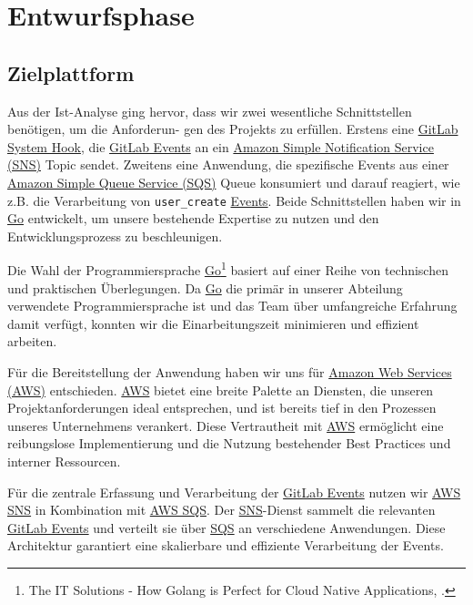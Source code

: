 \section{Entwurfsphase} 
\label{sec:Entwurfsphase}

\subsection{Zielplattform}
\label{sec:Zielplattform}

Aus der Ist-Analyse ging hervor, dass wir zwei wesentliche Schnittstellen benötigen, um die Anforderun-
gen des Projekts zu erfüllen. Erstens eine \hyperlink{GitLabSystemhooks}{\textcolor{AOBlau}{GitLab System Hook}}, die \hyperlink{GitLabEvent}{\textcolor{AOBlau}{GitLab Events}} an ein \hyperlink{SNS}{\textcolor{AOBlau}{Amazon Simple Notification Service (SNS)}} Topic sendet. Zweitens eine Anwendung, die spezifische Events aus einer \hyperlink{SQS}{\textcolor{AOBlau}{Amazon Simple Queue Service (SQS)}} Queue konsumiert und darauf reagiert, wie z.B. die Verarbeitung von \texttt{user\_create} \hyperlink{GitLabEvent}{\textcolor{AOBlau}{Events}}. Beide Schnittstellen haben wir in \hyperlink{Go}{\textcolor{AOBlau}{Go}} entwickelt, um unsere bestehende Expertise zu nutzen und den Entwicklungsprozess zu beschleunigen.

Die Wahl der Programmiersprache \hyperlink{Go}{\textcolor{AOBlau}{Go}}\footnote{The IT Solutions - How Golang is Perfect for Cloud Native Applications, \cite{Go}.} basiert auf einer Reihe von technischen und praktischen Überlegungen. Da \hyperlink{Go}{\textcolor{AOBlau}{Go}} die primär in unserer Abteilung verwendete Programmiersprache ist und das Team über umfangreiche Erfahrung damit verfügt, konnten wir die Einarbeitungszeit minimieren und effizient arbeiten.

Für die Bereitstellung der Anwendung haben wir uns für \hyperlink{AWS}{\textcolor{AOBlau}{Amazon Web Services (AWS)}} entschieden. \hyperlink{AWS}{\textcolor{AOBlau}{AWS}} bietet eine breite Palette an Diensten, die unseren Projektanforderungen ideal entsprechen, und ist bereits tief in den Prozessen unseres Unternehmens verankert. Diese Vertrautheit mit \hyperlink{AWS}{\textcolor{AOBlau}{AWS}} ermöglicht eine reibungslose Implementierung und die Nutzung bestehender Best Practices und interner Ressourcen.

Für die zentrale Erfassung und Verarbeitung der \hyperlink{GitLabEvent}{\textcolor{AOBlau}{GitLab Events}} nutzen wir \hyperlink{SNS}{\textcolor{AOBlau}{AWS SNS}} in Kombination mit \hyperlink{SQS}{\textcolor{AOBlau}{AWS SQS}}. Der \hyperlink{SNS}{\textcolor{AOBlau}{SNS}}-Dienst sammelt die relevanten \hyperlink{GitLabEvent}{\textcolor{AOBlau}{GitLab Events}} und verteilt sie über \hyperlink{SQS}{\textcolor{AOBlau}{SQS}} an verschiedene Anwendungen. Diese Architektur garantiert eine skalierbare und effiziente Verarbeitung der Events.

